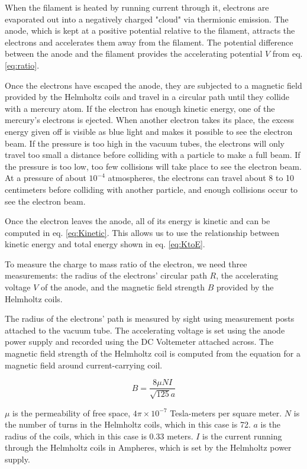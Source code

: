 \documentclass[journal, a4paper]{IEEEtran}
\begin{document}
    When the filament is heated by running current through it, electrons are evaporated out into a negatively charged "cloud" via thermionic emission. The anode, which is kept at a positive potential relative to the filament, attracts the electrons and accelerates them away from the filament. The potential difference between the anode and the filament provides the accelerating potential $V$ from eq. \ref{eq:ratio}.
    
    Once the electrons have escaped the anode, they are subjected to a magnetic field provided by the Helmholtz coils and travel in a circular path until they collide with a mercury atom. If the electron has enough kinetic energy, one of the mercury's electrons is ejected. When another electron takes its place, the excess energy given off is visible as blue light and makes it possible to see the electron beam. If the pressure is too high in the vacuum tubes, the electrons will only travel too small a distance before colliding with a particle to make a full beam. If the pressure is too low, too few collisions will take place to see the electron beam. At a pressure of about $10^{-4}$ atmospheres, the electrons can travel about 8 to 10 centimeters before colliding with another particle, and enough collisions occur to see the electron beam.
    
    Once the electron leaves the anode, all of its energy is kinetic and can be computed in eq. \ref{eq:Kinetic}. This allows us to use the relationship between kinetic energy and total energy shown in eq. \ref{eq:KtoE}. 
    
    To measure the charge to mass ratio of the electron, we need three measurements: the radius of the electrons' circular path $R$, the accelerating voltage $V$ of the anode, and the magnetic field strength $B$ provided by the Helmholtz coils.
    
    The radius of the electrons' path is measured by sight using measurement posts attached to the vacuum tube. The accelerating voltage is set using the anode power supply and recorded using the DC Voltemeter attached across. The magnetic field strength of the Helmholtz coil is computed from the equation for a magnetic field around current-carrying coil.
    
    \begin{equation} \label{eq:MagStrength} %
B=\frac{8\mu NI}{\sqrt{125}a}
\end{equation}

	$\mu$ is the permeability of free space, $4\pi  \times 10^{-7}$ Tesla-meters per square meter. $N$ is the number of turns in the Helmholtz coils, which in this case is 72. $a$ is the radius of the coils, which in this case is 0.33 meters. $I$ is the current running through the Helmholtz coils in Ampheres, which is set by the Helmholtz power supply. 
    
\end{document}
